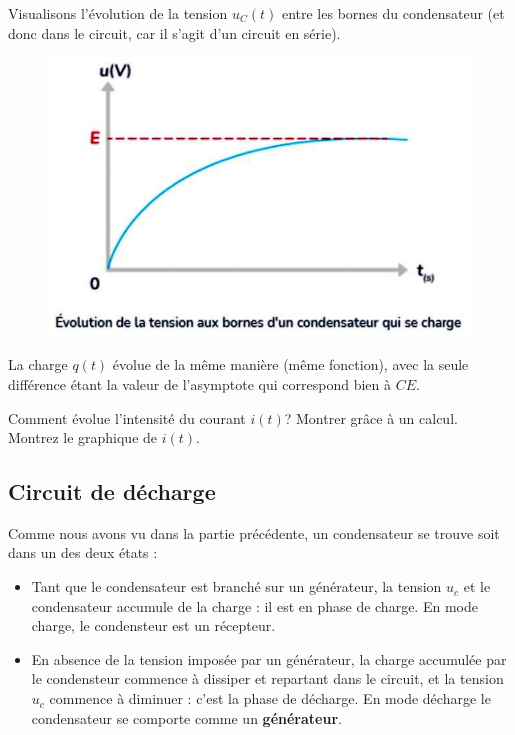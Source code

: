 \documentclass[11pt,a4paper]{article}
\begin{document}
Visualisons l'évolution de la tension $u_C(t)$ entre les bornes du condensateur (et donc dans le circuit, car il s'agit d'un circuit en série). 

\begin{figure}[H]
    \centering
    \includegraphics[width=0.7\linewidth]{imgs/p7/courbeCharge.jpg}
\end{figure}

La charge $q(t)$ évolue de la même manière (même fonction), avec la seule différence étant la valeur de l'asymptote qui correspond bien à $CE$. 

\begin{exo}
Comment évolue l'intensité du courant $i(t)$? Montrer grâce à un calcul. Montrez le graphique de $i(t)$. 
\vspace{5cm}
\end{exo}




\subsection{Circuit de décharge}

Comme nous avons vu dans la partie précédente, un condensateur se trouve soit dans un des deux états : 
\begin{itemize}
    \item Tant que le condensateur est branché sur un générateur, la tension $u_c $ et le condensateur accumule de la charge : il est en phase de charge. En mode charge, le condensteur est un récepteur. 
    \item En absence de la tension imposée par un générateur, la charge accumulée par le condensteur commence à dissiper et repartant dans le circuit, et la tension $u_c$ commence à diminuer : c'est la phase de décharge. En mode décharge le condensateur se comporte comme un \textbf{générateur}. 
\end{itemize}
\end{document}
